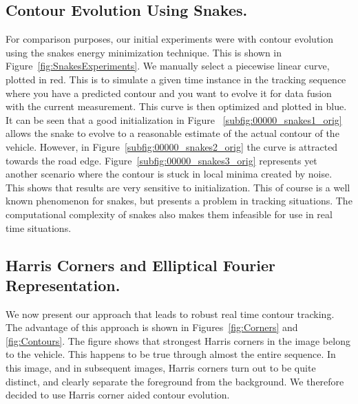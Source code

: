 \documentclass{article}
\begin{document}
\subsection{Contour Evolution Using Snakes.}
For comparison purposes, our initial experiments were with contour evolution using the snakes energy minimization technique.  This is shown in Figure~\ref{fig:SnakesExperiments}.  We manually select a piecewise linear curve, plotted in red.  This is to simulate a given time instance in the tracking sequence where you have a predicted contour and you want to evolve it for data fusion with the current measurement.  This curve is then optimized and plotted in blue.  It can be seen that a good initialization in Figure ~\ref{subfig:00000_snakes1_orig} allows the snake to evolve to a reasonable estimate of the actual contour of the vehicle.  However, in Figure~\ref{subfig:00000_snakes2_orig} the curve is attracted towards the road edge.  Figure~\ref{subfig:00000_snakes3_orig} represents yet another scenario where the contour is stuck in local minima created by noise.  This shows that results are very sensitive to initialization.  This of course is a well known phenomenon for snakes, but presents a problem in tracking situations.  The computational complexity of snakes also makes them infeasible for use in real time situations.


\subsection{Harris Corners and Elliptical Fourier Representation.}
We now present our approach that leads to robust real time contour tracking. The advantage of this approach is shown in Figures~\ref{fig:Corners} and \ref{fig:Contours}.  The figure shows that strongest Harris corners in the image belong to the vehicle.  This happens to be true through almost the entire sequence.  In this image, and in subsequent images, Harris corners turn out to be quite distinct, and clearly separate the foreground from the background.  We therefore decided to use Harris corner aided contour evolution. 
\end{document}
